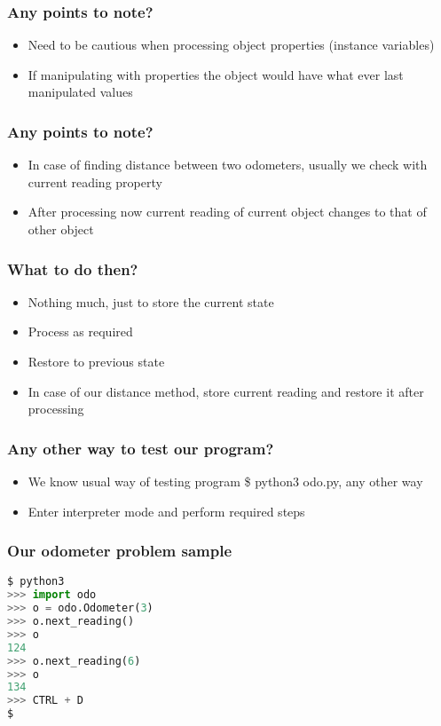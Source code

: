 \documentclass[14pt]{beamer}
\begin{document}
    \begin{frame}[containsverbatim]
        \frametitle{Any points to note?}
        \begin{itemize}
        \item Need to be cautious when processing object properties (instance variables)
        \item If manipulating with properties the object would have what ever last manipulated values
        \end{itemize}
	\end{frame}

    \begin{frame}[containsverbatim]
        \frametitle{Any points to note?}
        \begin{itemize}
        \item In case of finding distance between two odometers, usually we check with current reading property
        \item After processing now current reading of current object changes to that of other object

        \end{itemize}
    \end{frame}

    \begin{frame}[containsverbatim]
        \frametitle{What to do then?}
        \begin{itemize}
        \item Nothing much, just to store the current state 
        \item Process as required
        \item Restore to previous state 
        \item In case of our distance method, store current reading and restore it after processing
        \end{itemize}
    \end{frame}

    \begin{frame}[containsverbatim]
        \frametitle{Any other way to test our program?}
        \begin{itemize}
        \item We know usual way of testing program \$ python3 odo.py, any other way
        \item Enter interpreter mode and perform required steps
        \end{itemize}
    \end{frame}
    \begin{frame}[containsverbatim]
        \frametitle{Our odometer problem sample}
        \begin{lstlisting}[language=Python]
$ python3
>>> import odo
>>> o = odo.Odometer(3)
>>> o.next_reading()
>>> o
124
>>> o.next_reading(6)
>>> o
134
>>> CTRL + D 
$
        \end{lstlisting}
    \end{frame}
\end{document}
